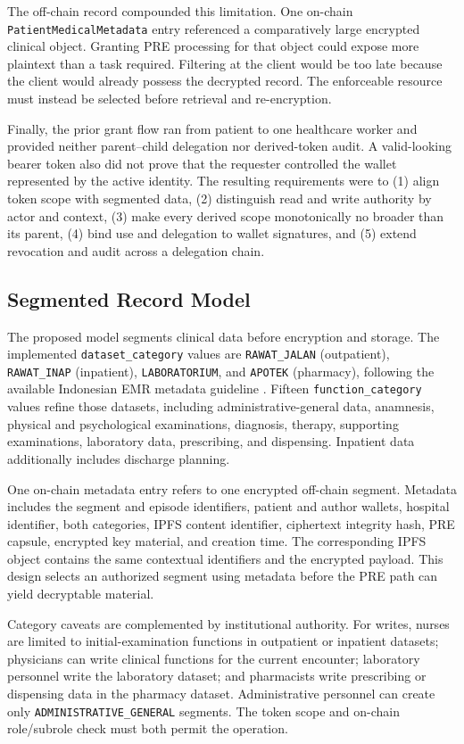 \documentclass[conference,a4paper,english]{IEEEtran}
\begin{document}
The off-chain record compounded this limitation. One on-chain \texttt{PatientMedicalMetadata} entry referenced a comparatively large encrypted clinical object. Granting PRE processing for that object could expose more plaintext than a task required. Filtering at the client would be too late because the client would already possess the decrypted record. The enforceable resource must instead be selected before retrieval and re-encryption.

Finally, the prior grant flow ran from patient to one healthcare worker and provided neither parent--child delegation nor derived-token audit. A valid-looking bearer token also did not prove that the requester controlled the wallet represented by the active identity. The resulting requirements were to (1) align token scope with segmented data, (2) distinguish read and write authority by actor and context, (3) make every derived scope monotonically no broader than its parent, (4) bind use and delegation to wallet signatures, and (5) extend revocation and audit across a delegation chain.

\subsection{Segmented Record Model}

The proposed model segments clinical data before encryption and storage. The implemented \texttt{dataset\_category} values are \texttt{RAWAT\_JALAN} (outpatient), \texttt{RAWAT\_INAP} (inpatient), \texttt{LABORATORIUM}, and \texttt{APOTEK} (pharmacy), following the available Indonesian EMR metadata guideline \cite{kemenkes1423-2022}. Fifteen \texttt{function\_category} values refine those datasets, including administrative-general data, anamnesis, physical and psychological examinations, diagnosis, therapy, supporting examinations, laboratory data, prescribing, and dispensing. Inpatient data additionally includes discharge planning.

One on-chain metadata entry refers to one encrypted off-chain segment. Metadata includes the segment and episode identifiers, patient and author wallets, hospital identifier, both categories, IPFS content identifier, ciphertext integrity hash, PRE capsule, encrypted key material, and creation time. The corresponding IPFS object contains the same contextual identifiers and the encrypted payload. This design selects an authorized segment using metadata before the PRE path can yield decryptable material.

Category caveats are complemented by institutional authority. For writes, nurses are limited to initial-examination functions in outpatient or inpatient datasets; physicians can write clinical functions for the current encounter; laboratory personnel write the laboratory dataset; and pharmacists write prescribing or dispensing data in the pharmacy dataset. Administrative personnel can create only \texttt{ADMINISTRATIVE\_GENERAL} segments. The token scope and on-chain role/subrole check must both permit the operation.
\end{document}
